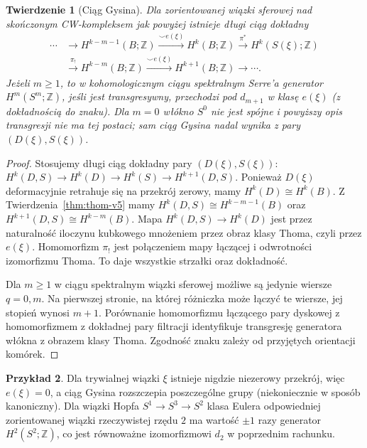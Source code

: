 \documentclass[11pt,a4paper,oneside]{report}
\newcommand{\Z}{\mathbb{Z}}
\theoremstyle{plain}
\newtheorem{twierdzenie}{Twierdzenie}[section]
\theoremstyle{definition}
\newtheorem{przyklad}[twierdzenie]{Przykład}
\theoremstyle{remark}
\begin{document}
\begin{twierdzenie}[Ciąg Gysina]
\label{thm:gysin-v5}
Dla zorientowanej wiązki sferowej nad skończonym CW-kompleksem
jak powyżej istnieje
długi ciąg dokładny
\[
\begin{aligned}
\cdots &\to H^{k-m-1}(B;\Z)
\xrightarrow{\smile e(\xi)}H^k(B;\Z)
\xrightarrow{\pi^*}H^k(S(\xi);\Z)\\
&\xrightarrow{\pi_!}H^{k-m}(B;\Z)
\xrightarrow{\smile e(\xi)}H^{k+1}(B;\Z)\to\cdots.
\end{aligned}
\]
Jeżeli $m\ge1$, to w kohomologicznym ciągu spektralnym
Serre'a generator $H^m(S^m;\Z)$, jeśli jest transgresywny,
przechodzi pod $d_{m+1}$ w klasę $e(\xi)$
(z dokładnością do znaku). Dla $m=0$ włókno $S^0$
nie jest spójne i powyższy opis transgresji nie ma
tej postaci; sam ciąg Gysina nadal wynika z pary
$(D(\xi),S(\xi))$.
\end{twierdzenie}
\begin{proof}
Stosujemy długi ciąg dokładny pary
$(D(\xi),S(\xi))$:
$H^k(D,S)\to H^k(D)\to H^k(S)\to H^{k+1}(D,S)$.
Ponieważ $D(\xi)$ deformacyjnie retrahuje się na przekrój
zerowy, mamy $H^k(D)\cong H^k(B)$.
Z Twierdzenia~\ref{thm:thom-v5} mamy
$H^k(D,S)\cong H^{k-m-1}(B)$ oraz
$H^{k+1}(D,S)\cong H^{k-m}(B)$.
Mapa $H^k(D,S)\to H^k(D)$ jest przez naturalność
iloczynu kubkowego mnożeniem przez obraz klasy Thoma,
czyli przez $e(\xi)$. Homomorfizm $\pi_!$ jest
połączeniem mapy łączącej i odwrotności izomorfizmu Thoma.
To daje wszystkie strzałki oraz dokładność.

Dla $m\ge1$ w ciągu spektralnym wiązki sferowej możliwe
są jedynie wiersze $q=0,m$. Na pierwszej stronie, na której
różniczka może łączyć te wiersze, jej stopień wynosi $m+1$.
Porównanie homomorfizmu łączącego pary dyskowej
z homomorfizmem z dokładnej pary filtracji identyfikuje
transgresję generatora włókna z obrazem klasy Thoma.
Zgodność znaku zależy od przyjętych orientacji komórek.
\end{proof}
\begin{przyklad}
Dla trywialnej wiązki $\xi$ istnieje nigdzie niezerowy
przekrój, więc $e(\xi)=0$, a ciąg Gysina rozszczepia
poszczególne grupy (niekoniecznie w sposób kanoniczny).
Dla wiązki Hopfa $S^1\to S^3\to S^2$ klasa Eulera
odpowiedniej zorientowanej wiązki rzeczywistej rzędu $2$
ma wartość $\pm1$ razy generator $H^2(S^2;\Z)$,
co jest równoważne izomorfizmowi $d_2$ w poprzednim rachunku.
\end{przyklad}
\end{document}
